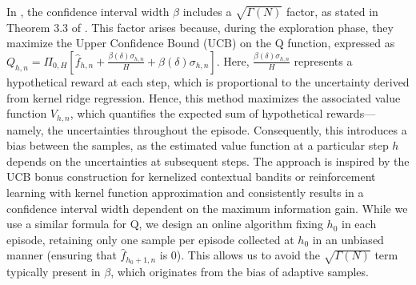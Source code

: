 \documentclass{article}
\begin{document}
In \cite{qiu2021reward}, the confidence interval width $\beta$ includes a $\sqrt{\Gamma(N)}$ factor, as stated in Theorem 3.3 of \cite{qiu2021reward}. This factor arises because, during the exploration phase, they maximize the Upper Confidence Bound (UCB) on the Q function, expressed as $Q_{h,n} = \Pi_{0,H} \left[ \hat{f}_{h,n} + \frac{\beta(\delta) \sigma_{h,n}}{H} + \beta(\delta) \sigma_{h,n} \right]$. Here, $\frac{\beta(\delta) \sigma_{h,n}}{H}$ represents a hypothetical reward at each step, which is proportional to the uncertainty derived from kernel ridge regression. Hence, this method maximizes the associated value function $V_{h,n}$, which quantifies the expected sum of hypothetical rewards— namely, the uncertainties throughout the episode. Consequently, this introduces a bias between the samples, as the estimated value function at a particular step $h$ depends on the uncertainties at subsequent steps. The approach is inspired by the UCB bonus construction for kernelized contextual bandits or reinforcement learning with kernel function approximation and consistently results in a confidence interval width dependent on the maximum information gain.
While we use a similar formula for Q, we design an online algorithm fixing $h_0$ in each episode, retaining only one sample per episode collected at $h_0$ in an unbiased manner (ensuring that $\hat{f}_{h_0+1,n}$ is 0). This allows us to avoid the $\sqrt{\Gamma(N)}$ term typically present in $\beta$, which originates from the bias of adaptive samples.
\end{document}
